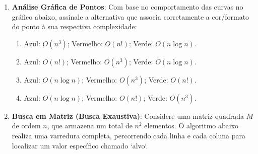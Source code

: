 \documentclass[12pt]{article}
\begin{document}
\begin{enumerate}[label=\arabic*), leftmargin=1.5cm, itemsep=0.8cm]
    \item \textbf{Análise Gráfica de Pontos}: Com base no comportamento das curvas no gráfico abaixo, assinale a alternativa que associa corretamente a cor/formato do ponto à sua respectiva complexidade:
    \begin{center}
    \end{center}
    
    \begin{enumerate}[label=\alph*)]
        \item Azul: $O(n^3)$; Vermelho: $O(n!)$; Verde: $O(n \log n)$.
        \item Azul: $O(n!)$; Vermelho: $O(n^3)$; Verde: $O(n \log n)$.
        \item Azul: $O(n \log n)$; Vermelho: $O(n^3)$; Verde: $O(n!)$.
        \item Azul: $O(n \log n)$; Vermelho: $O(n!)$; Verde: $O(n^3)$.
    \end{enumerate}

    \item \textbf{Busca em Matriz (Busca Exaustiva)}: Considere uma matriz quadrada $M$ de ordem $n$, que armazena um total de $n^2$ elementos. O algoritmo abaixo realiza uma varredura completa, percorrendo cada linha e cada coluna para localizar um valor específico chamado `alvo`. 
    

\end{enumerate}
\end{document}
